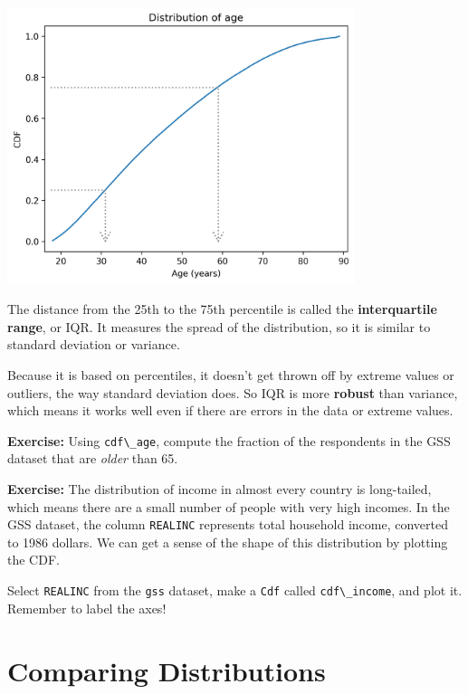 \begin{center}
\includegraphics[width=4in]{chapters/08_distributions_files/08_distributions_77_0.png}
\end{center}

The distance from the 25th to the 75th percentile is called the
\textbf{interquartile range}, or IQR. It measures the spread of the
distribution, so it is similar to standard deviation or variance.

Because it is based on percentiles, it doesn't get thrown off by extreme
values or outliers, the way standard deviation does. So IQR is more
\textbf{robust} than variance, which means it works well even if there
are errors in the data or extreme values.

\textbf{Exercise:} Using \passthrough{\lstinline!cdf\_age!}, compute the
fraction of the respondents in the GSS dataset that are \emph{older}
than 65.

\textbf{Exercise:} The distribution of income in almost every country is
long-tailed, which means there are a small number of people with very
high incomes. In the GSS dataset, the column
\passthrough{\lstinline!REALINC!} represents total household income,
converted to 1986 dollars. We can get a sense of the shape of this
distribution by plotting the CDF.

Select \passthrough{\lstinline!REALINC!} from the
\passthrough{\lstinline!gss!} dataset, make a
\passthrough{\lstinline!Cdf!} called
\passthrough{\lstinline!cdf\_income!}, and plot it. Remember to label
the axes!

\hypertarget{comparing-distributions}{%
\section{Comparing Distributions}\label{comparing-distributions}}


